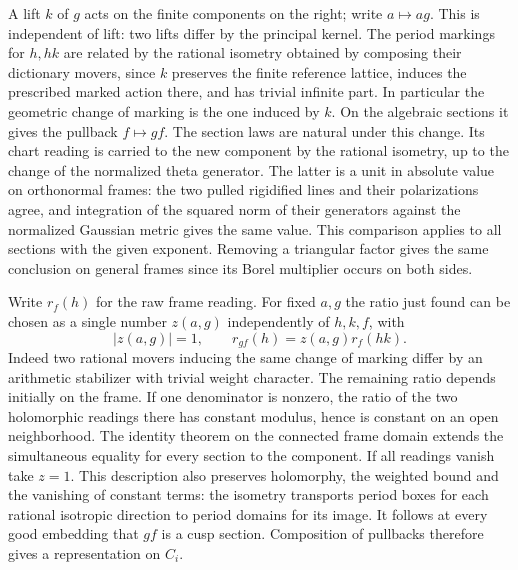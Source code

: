 A lift $k$ of $g$ acts on the finite components on the right;
write $a\mapsto ag$. This is independent of lift: two lifts
differ by the principal kernel. The period markings for $h,hk$
are related by the rational isometry obtained by composing their
dictionary movers, since $k$ preserves the finite reference lattice,
induces the prescribed marked action there, and has trivial
infinite part. In particular the geometric change of marking is
the one induced by $k$. On the algebraic sections it gives the
pullback $f\mapsto gf$. The section laws are natural under this
change. Its chart reading is carried to the new component by
the rational isometry, up to the change of the normalized
theta generator. The latter is a unit in absolute value on
orthonormal frames: the two pulled rigidified lines and their
polarizations agree, and integration of the squared norm of their
generators against the normalized Gaussian metric gives the same
value. This comparison applies to all sections with the given
exponent. Removing a triangular factor gives the same conclusion
on general frames since its Borel multiplier occurs on both sides.

Write $r_f(h)$ for the raw frame reading. For fixed $a,g$ the
ratio just found can be chosen as a single number $z(a,g)$
independently of $h,k,f$, with
\[
 |z(a,g)|=1,\qquad r_{gf}(h)=z(a,g)r_f(hk).
\]
Indeed two rational movers inducing the same change of marking
differ by an arithmetic stabilizer with trivial weight character.
The remaining ratio depends initially on the frame. If one
denominator is nonzero, the ratio of the two holomorphic readings
there has constant modulus, hence is constant on an open
neighborhood. The identity theorem on the connected frame domain
extends the simultaneous equality for every section to the
component. If all readings vanish take $z=1$. This description
also preserves holomorphy, the weighted bound and the vanishing
of constant terms: the isometry transports period boxes for each
rational isotropic direction to period domains for its image.
It follows at every good embedding that $gf$ is a cusp section.
Composition of pullbacks therefore gives a representation on $C_i$.

